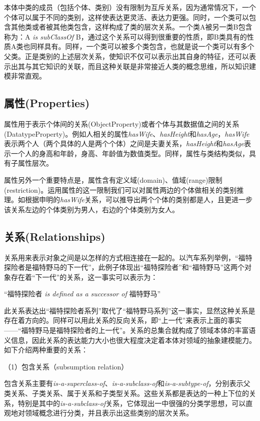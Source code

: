 本体中类的成员（包括个体、类别）没有限制为互斥关系，因为通常情况下，一个个体可以属于不同的类别，这样使表达更灵活、表达力更强。同时，一个类可以包含其他类或者被其他类包含，这样构成了类的层次关系。一个类A被另一类B包含称为：A \textit{is subClassOf} B，通过这个关系可以得到很重要的性质，即B类具有的性质A类也同样具有。同样，一个类可以被多个类包含，也就是说一个类可以有多个父类。正是类别的上述层次关系，使知识不仅可以表示出其自身的特征，还可以表示出其与其它知识的关联，而且这种关联是非常接近人类的概念思维，所以知识建模非常直观。

\subsection{属性(Properties)}
属性用于表示个体间的关系(ObjectProperty)或者个体与其数据值之间的关系(DatatypeProperty)。例如人相关的属性\textit{hasWife}、\textit{hasHeight}和\textit{hasAge}，\textit{hasWife}表示两个人（两个具体的人是两个个体）之间是夫妻关系，\textit{hasHeight}和\textit{hasAge}表示一个人的身高和年龄，身高、年龄值为数值类型。同样，属性与类结构类似，具有子属性层次。

属性另外一个重要特点是，属性含有定义域(domain)、值域(range)限制(restriction)。运用属性的这一限制我们可以对属性两边的个体做相关的类别推理。如根据申明的\textit{hasWife}关系，可以推导出两个个体的类别都是人，且更进一步该关系左边的个体类别为男人，右边的个体类别为女人。

\subsection{关系(Relationships)}
关系用来表示对象之间是以怎样的方式相连接在一起的。以汽车系列举例，“福特探险者是福特野马的下一代”，此例子体现出“福特探险者”和“福特野马”这两个对象存在着“下一代”的关系，这一事实可以表示为：

\begin{center}
	“福特探险者 \textit{is defined as a successor of} 福特野马”
\end{center}

此关系表达出“福特探险者系列”取代了“福特野马系列”这一事实，显然这种关系是存在着方向的。同样可以用此关系的反向关系，即“上一代”来表示上面的事实——“福特野马是福特探险者的上一代”。关系的总集合就构成了领域本体的丰富语义信息，因此关系的表达能力大小也很大程度决定着本体对领域的抽象建模能力。如下介绍两种重要的关系：

（1）包含关系（subsumption relation）

包含关系主要有\textit{is-a-superclass-of}、\textit{is-a-subclass-of}和\textit{is-a-subtype-of}，分别表示父类关系、子类关系、属于关系和子类型关系。这些关系都是表达的一种上下位的关系，特别是其中的\textit{is-a-subclass-of}关系，它体现出一中很强的分类学思想，可以直观地对领域概念进行分类，并且表示出这些类别的层次关系。

